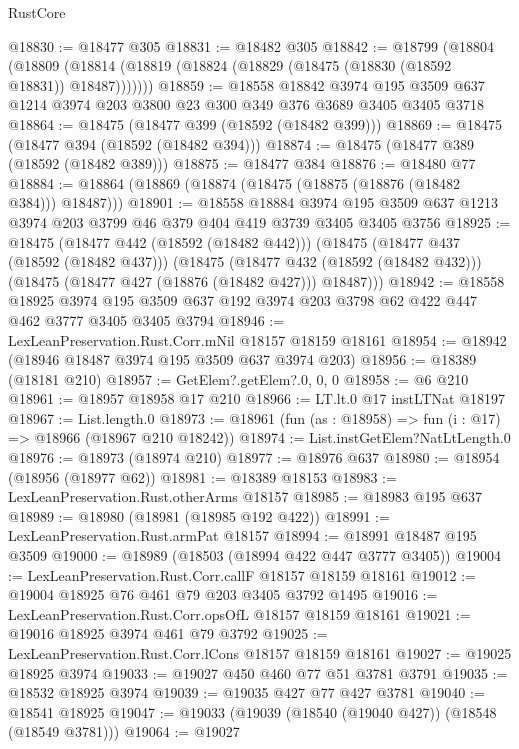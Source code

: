 \begin{lexlean}{RustCore}
\begin{coremodule}
@18830 := @18477 @305
@18831 := @18482 @305
@18842 := @18799
    (@18804 (@18809 (@18814 (@18819 (@18824 (@18829 (@18475 (@18830 (@18592 @18831)) @18487)))))))
@18859 := @18558
    @18842
    @3974
    @195
    @3509
    @637
    @1214
    @3974
    @203
    @3800
    @23
    @300
    @349
    @376
    @3689
    @3405
    @3405
    @3718
@18864 := @18475 (@18477 @399 (@18592 (@18482 @399)))
@18869 := @18475 (@18477 @394 (@18592 (@18482 @394)))
@18874 := @18475 (@18477 @389 (@18592 (@18482 @389)))
@18875 := @18477 @384
@18876 := @18480 @77
@18884 := @18864 (@18869 (@18874 (@18475 (@18875 (@18876 (@18482 @384))) @18487)))
@18901 := @18558
    @18884
    @3974
    @195
    @3509
    @637
    @1213
    @3974
    @203
    @3799
    @46
    @379
    @404
    @419
    @3739
    @3405
    @3405
    @3756
@18925 := @18475
    (@18477 @442 (@18592 (@18482 @442)))
    (@18475
      (@18477 @437 (@18592 (@18482 @437)))
      (@18475
        (@18477 @432 (@18592 (@18482 @432)))
        (@18475 (@18477 @427 (@18876 (@18482 @427))) @18487)))
@18942 := @18558
    @18925
    @3974
    @195
    @3509
    @637
    @192
    @3974
    @203
    @3798
    @62
    @422
    @447
    @462
    @3777
    @3405
    @3405
    @3794
@18946 := LexLeanPreservation.Rust.Corr.mNil @18157 @18159 @18161
@18954 := @18942 (@18946 @18487 @3974 @195 @3509 @637 @3974 @203)
@18956 := @18389 (@18181 @210)
@18957 := GetElem?.getElem?.{0, 0, 0}
@18958 := @6 @210
@18961 := @18957 @18958 @17 @210
@18966 := LT.lt.{0} @17 instLTNat @18197
@18967 := List.length.{0}
@18973 := @18961 (fun (as : @18958) => fun (i : @17) => @18966 (@18967 @210 @18242))
@18974 := List.instGetElem?NatLtLength.{0}
@18976 := @18973 (@18974 @210)
@18977 := @18976 @637
@18980 := @18954 (@18956 (@18977 @62))
@18981 := @18389 @18153
@18983 := LexLeanPreservation.Rust.otherArms @18157
@18985 := @18983 @195 @637
@18989 := @18980 (@18981 (@18985 @192 @422))
@18991 := LexLeanPreservation.Rust.armPat @18157
@18994 := @18991 @18487 @195 @3509
@19000 := @18989 (@18503 (@18994 @422 @447 @3777 @3405))
@19004 := LexLeanPreservation.Rust.Corr.callF @18157 @18159 @18161
@19012 := @19004 @18925 @76 @461 @79 @203 @3405 @3792 @1495
@19016 := LexLeanPreservation.Rust.Corr.opsOfL @18157 @18159 @18161
@19021 := @19016 @18925 @3974 @461 @79 @3792
@19025 := LexLeanPreservation.Rust.Corr.lCons @18157 @18159 @18161
@19027 := @19025 @18925 @3974
@19033 := @19027 @450 @460 @77 @51 @3781 @3791
@19035 := @18532 @18925 @3974
@19039 := @19035 @427 @77 @427 @3781
@19040 := @18541 @18925
@19047 := @19033 (@19039 (@18540 (@19040 @427)) (@18548 (@18549 @3781)))
@19064 := @19027

\end{coremodule}
\end{lexlean}
